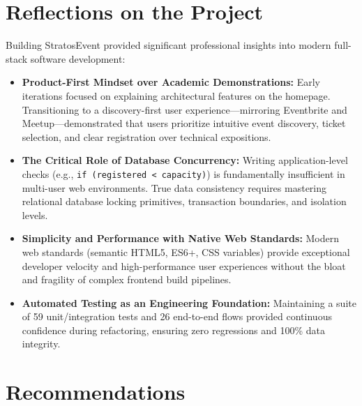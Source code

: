\documentclass[11pt,a4paper]{article}
\begin{document}
\newpage
\section*{{\color{TitleBlue}\bfseries
\fontsize{18}{22}\selectfont Reflections on the Project}}

\justifying

Building StratosEvent provided significant professional insights into modern full-stack software development:

\begin{itemize}[leftmargin=*]
    \item \textbf{Product-First Mindset over Academic Demonstrations:} Early iterations focused on explaining architectural features on the homepage. Transitioning to a discovery-first user experience—mirroring Eventbrite and Meetup—demonstrated that users prioritize intuitive event discovery, ticket selection, and clear registration over technical expositions.
    \item \textbf{The Critical Role of Database Concurrency:} Writing application-level checks (e.g., \texttt{if (registered < capacity)}) is fundamentally insufficient in multi-user web environments. True data consistency requires mastering relational database locking primitives, transaction boundaries, and isolation levels.
    \item \textbf{Simplicity and Performance with Native Web Standards:} Modern web standards (semantic HTML5, ES6+, CSS variables) provide exceptional developer velocity and high-performance user experiences without the bloat and fragility of complex frontend build pipelines.
    \item \textbf{Automated Testing as an Engineering Foundation:} Maintaining a suite of 59 unit/integration tests and 26 end-to-end flows provided continuous confidence during refactoring, ensuring zero regressions and 100\% data integrity.
\end{itemize}

\newpage
\section*{{\color{TitleBlue}\bfseries
\fontsize{18}{22}\selectfont Recommendations}}
\end{document}
